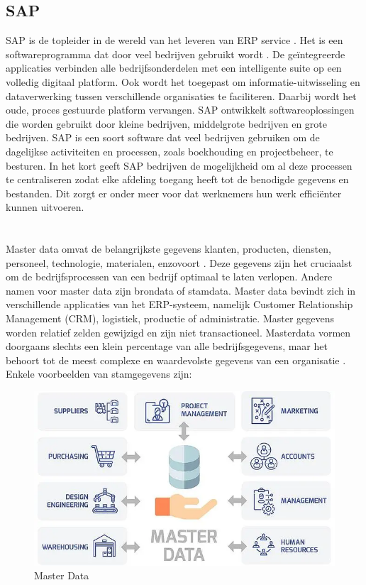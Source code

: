 \subsection{SAP}
SAP is de topleider in de wereld van het leveren van ERP service \autocite{WatSAP}. Het is een softwareprogramma dat door veel bedrijven gebruikt wordt \autocite{Indeed2023}. De geïntegreerde applicaties verbinden alle bedrijfsonderdelen met een intelligente suite op een volledig digitaal platform. Ook wordt het toegepast om informatie-uitwisseling en dataverwerking tussen verschillende organisaties te faciliteren. Daarbij wordt het oude, proces gestuurde platform vervangen. SAP ontwikkelt softwareoplossingen die worden gebruikt door kleine bedrijven, middelgrote bedrijven en grote bedrijven.
SAP is een soort software dat veel bedrijven gebruiken om de dagelijkse activiteiten en processen, zoals boekhouding en projectbeheer, te besturen. In het kort geeft SAP bedrijven de mogelijkheid om al deze processen te centraliseren zodat elke afdeling toegang heeft tot de benodigde gegevens en bestanden. Dit zorgt er onder meer voor dat werknemers hun werk efficiënter kunnen uitvoeren.

\section{}%
\label{sec:masterdata}
Master data omvat de belangrijkste gegevens klanten, producten, diensten, personeel, technologie, materialen, enzovoort \autocite{Prokhorov2018}. Deze gegevens zijn het cruciaalst om de bedrijfsprocessen van een bedrijf optimaal te laten verlopen. Andere namen voor master data zijn brondata of stamdata. Master data bevindt zich in verschillende applicaties van het ERP-systeem, namelijk Customer Relationship Management (CRM), logistiek, productie of administratie. Master gegevens worden relatief zelden gewijzigd en zijn niet transactioneel.
Masterdata vormen doorgaans slechts een klein percentage van alle bedrijfsgegevens, maar het behoort tot de meest complexe en waardevolste gegevens van een organisatie \autocite{SAPMasterData}. 
Enkele voorbeelden van stamgegevens zijn: 

\begin{figure}[htbp]
  \centering
  \includegraphics[scale=0.5]{../images/Master-Data.png}
  \caption{Master Data}
\end{figure}

